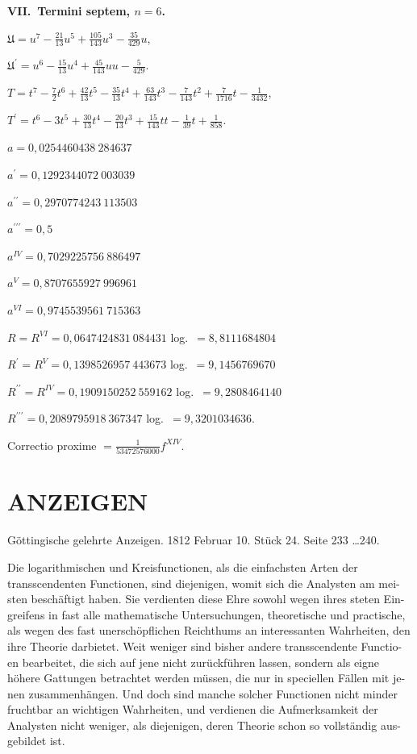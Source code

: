 \documentclass[12pt,a4paper]{article}
\newcommand{\UU}{\mathfrak{U}}
\begin{document}
\textbf{VII.\ Termini septem, $n = 6$.}

\medskip

$\UU = u^7 - \tfrac{21}{13}u^5 + \tfrac{105}{143}u^3 - \tfrac{35}{429}u$,

$\UU^\prime = u^6 - \tfrac{15}{13}u^4 + \tfrac{45}{143}uu - \tfrac{5}{429}$.

$T = t^7 - \tfrac{7}{2}t^6 + \tfrac{42}{13}t^5 - \tfrac{35}{13}t^4 + \tfrac{63}{143}t^3 - \tfrac{7}{143}t^2 + \tfrac{7}{1716}t - \tfrac{1}{3432}$,

$T^\prime = t^6 - 3t^5 + \tfrac{30}{13}t^4 - \tfrac{20}{13}t^3 + \tfrac{15}{143}tt - \tfrac{1}{39}t + \tfrac{1}{858}$.

$a = 0{,}0254460438\ 284637$

$a^\prime = 0{,}1292344072\ 003039$

$a^{\prime\prime} = 0{,}2970774243\ 113503$

$a^{\prime\prime\prime} = 0{,}5$

$a^{IV} = 0{,}7029225756\ 886497$

$a^V = 0{,}8707655927\ 996961$

$a^{VI} = 0{,}9745539561\ 715363$

$R = R^{VI} = 0{,}0647424831\ 084431$ \quad log.\ $= 8{,}8111684804$

$R^\prime = R^V = 0{,}1398526957\ 443673$ \quad log.\ $= 9{,}1456769670$

$R^{\prime\prime} = R^{IV} = 0{,}1909150252\ 559162$ \quad log.\ $= 9{,}2808464140$

$R^{\prime\prime\prime} = 0{,}2089795918\ 367347$ \quad log.\ $= 9{,}3201034636$.

Correctio proxime $= \tfrac{1}{53472576000} f^{XIV}$.

\section*{ANZEIGEN}


Göttingische gelehrte Anzeigen. 1812 Februar 10. Stück 24. Seite 233 \ldots 240.

Die logarithmischen und Kreisfunctionen, als die einfachsten Arten der
transscendenten Functionen, sind diejenigen, womit sich die Analysten am mei-
sten beschäftigt haben. Sie verdienten diese Ehre sowohl wegen ihres steten Ein-
greifens in fast alle mathematische Untersuchungen, theoretische und practische,
als wegen des fast unerschöpflichen Reichthums an interessanten Wahrheiten, den
ihre Theorie darbietet. Weit weniger sind bisher andere transscendente Functio-
en bearbeitet, die sich auf jene nicht zurückführen lassen, sondern als eigne
höhere Gattungen betrachtet werden müssen, die nur in speciellen Fällen mit je-
nen zusammenhängen. Und doch sind manche solcher Functionen nicht minder
fruchtbar an wichtigen Wahrheiten, und verdienen die Aufmerksamkeit der
Analysten nicht weniger, als diejenigen, deren Theorie schon so vollständig aus-
gebildet ist.
\end{document}
